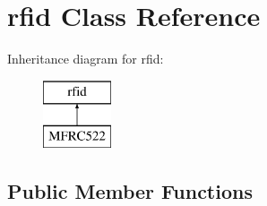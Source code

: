 \hypertarget{classrfid}{}\section{rfid Class Reference}
\label{classrfid}
Inheritance diagram for rfid\+:\begin{figure}[H]
\begin{center}
\leavevmode
\includegraphics[height=2.000000cm]{classrfid}
\end{center}
\end{figure}
\subsection*{Public Member Functions}
